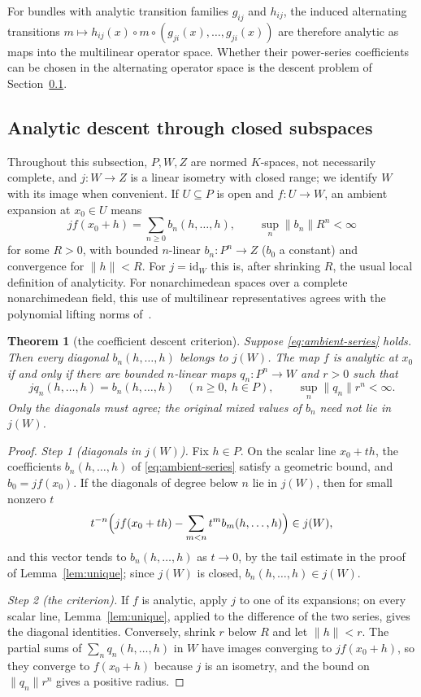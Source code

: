 \documentclass[11pt]{amsart}
\newtheorem{theorem}{Theorem}[section]
\theoremstyle{definition}
\theoremstyle{remark}
\numberwithin{equation}{section}
\newcommand{\id}{\mathrm{id}}
\newcommand{\norm}[1]{\lVert #1\rVert}
\theoremstyle{plain}
\theoremstyle{definition}
\theoremstyle{plain}
\begin{document}
For bundles with analytic transition families $g_{ij}$ and $h_{ij}$, the induced alternating transitions $m\mapsto h_{ij}(x)\circ m\circ(g_{ji}(x),\ldots,g_{ji}(x))$ are therefore analytic as maps into the multilinear operator space. Whether their power-series coefficients can be chosen in the alternating operator space is the descent problem of Section~\ref{sec:descent}.

\subsection{Analytic descent through closed subspaces}\label{sec:descent}

Throughout this subsection, $P,W,Z$ are normed $K$-spaces, not necessarily complete, and $j\colon W\to Z$ is a linear isometry with closed range; we identify $W$ with its image when convenient. If $U\subseteq P$ is open and $f\colon U\to W$, an ambient expansion at $x_0\in U$ means
\begin{equation}\label{eq:ambient-series}
 jf(x_0+h)=\sum_{n\ge0}b_n(h,\ldots,h),\qquad
 \sup_n\norm{b_n}R^n<\infty
\end{equation}
for some $R>0$, with bounded $n$-linear $b_n\colon P^n\to Z$ ($b_0$ a constant) and convergence for $\norm h<R$. For $j=\id_W$ this is, after shrinking $R$, the usual local definition of analyticity. For nonarchimedean spaces over a complete nonarchimedean field, this use of multilinear representatives agrees with the polynomial lifting norms of~\cite[7.14--7.19]{BGN}.

\begin{theorem}[the coefficient descent criterion]\label{thm:coefficient-descent}
Suppose \eqref{eq:ambient-series} holds. Then every diagonal $b_n(h,\ldots,h)$ belongs to $j(W)$. The map $f$ is analytic at $x_0$ if and only if there are bounded $n$-linear maps $q_n\colon P^n\to W$ and $r>0$ such that
\[
 jq_n(h,\ldots,h)=b_n(h,\ldots,h)\quad(n\ge0,\ h\in P),
 \qquad \sup_n\norm{q_n}r^n<\infty.
\]
Only the diagonals must agree; the original mixed values of $b_n$ need not lie in $j(W)$.
\end{theorem}

\begin{proof}
\emph{Step 1 (diagonals in $j(W)$).} Fix $h\in P$. On the scalar line $x_0+th$, the coefficients $b_n(h,\ldots,h)$ of \eqref{eq:ambient-series} satisfy a geometric bound, and $b_0=jf(x_0)$. If the diagonals of degree below $n$ lie in $j(W)$, then for small nonzero $t$
\[
 t^{-n}\Bigl(jf(x_0+th)-\sum_{m<n}t^m b_m(h,\ldots,h)\Bigr)\in j(W),
\]
and this vector tends to $b_n(h,\ldots,h)$ as $t\to0$, by the tail estimate in the proof of Lemma~\ref{lem:unique}; since $j(W)$ is closed, $b_n(h,\ldots,h)\in j(W)$.

\emph{Step 2 (the criterion).} If $f$ is analytic, apply $j$ to one of its expansions; on every scalar line, Lemma~\ref{lem:unique}, applied to the difference of the two series, gives the diagonal identities. Conversely, shrink $r$ below $R$ and let $\norm h<r$. The partial sums of $\sum_nq_n(h,\ldots,h)$ in $W$ have images converging to $jf(x_0+h)$, so they converge to $f(x_0+h)$ because $j$ is an isometry, and the bound on $\norm{q_n}r^n$ gives a positive radius.
\end{proof}
\end{document}
